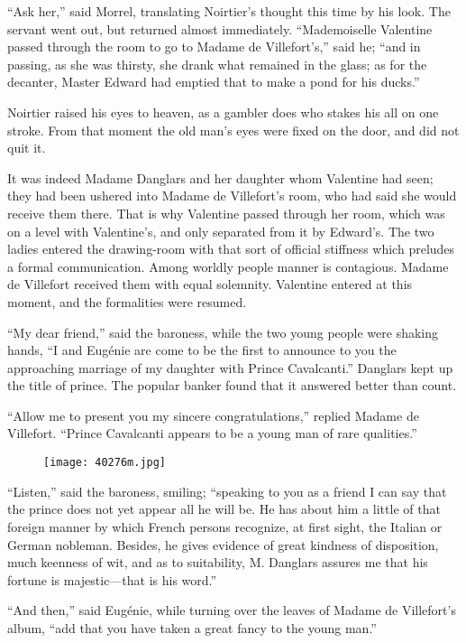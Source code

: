 “Ask her,” said Morrel, translating Noirtier’s thought this time by his
look. The servant went out, but returned almost immediately.
“Mademoiselle Valentine passed through the room to go to Madame de
Villefort’s,” said he; “and in passing, as she was thirsty, she drank
what remained in the glass; as for the decanter, Master Edward had
emptied that to make a pond for his ducks.”

Noirtier raised his eyes to heaven, as a gambler does who stakes his
all on one stroke. From that moment the old man’s eyes were fixed on
the door, and did not quit it.

It was indeed Madame Danglars and her daughter whom Valentine had seen;
they had been ushered into Madame de Villefort’s room, who had said she
would receive them there. That is why Valentine passed through her
room, which was on a level with Valentine’s, and only separated from it
by Edward’s. The two ladies entered the drawing-room with that sort of
official stiffness which preludes a formal communication. Among worldly
people manner is contagious. Madame de Villefort received them with
equal solemnity. Valentine entered at this moment, and the formalities
were resumed.

“My dear friend,” said the baroness, while the two young people were
shaking hands, “I and Eugénie are come to be the first to announce to
you the approaching marriage of my daughter with Prince Cavalcanti.”
Danglars kept up the title of prince. The popular banker found that it
answered better than count.

“Allow me to present you my sincere congratulations,” replied Madame de
Villefort. “Prince Cavalcanti appears to be a young man of rare
qualities.”

\begin{figure}[ht]
\texttt{[image: 40276m.jpg]}
\end{figure}

“Listen,” said the baroness, smiling; “speaking to you as a friend I
can say that the prince does not yet appear all he will be. He has
about him a little of that foreign manner by which French persons
recognize, at first sight, the Italian or German nobleman. Besides, he
gives evidence of great kindness of disposition, much keenness of wit,
and as to suitability, M. Danglars assures me that his fortune is
majestic—that is his word.”

“And then,” said Eugénie, while turning over the leaves of Madame de
Villefort’s album, “add that you have taken a great fancy to the young
man.”

